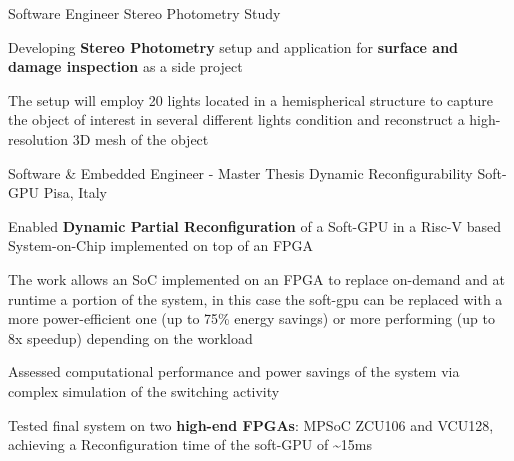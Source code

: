 

\begin{cventries}

  \cventry
    {Software Engineer} %
    {Stereo Photometry Study} %
    {} %
    {} %
    {
      \begin{cvitems} %
        \item {Developing \textbf{Stereo Photometry} setup and application for \textbf{surface and damage inspection} as a side project}
        \item {The setup will employ 20 lights located in a hemispherical structure to capture the object of interest in several different lights condition
        and reconstruct a high-resolution 3D mesh of the object}
      \end{cvitems}
    }

  \cventry
    {Software \& Embedded Engineer - Master Thesis} %
    {Dynamic Reconfigurability Soft-GPU} %
    {Pisa, Italy} %
    {} %
    {
      \begin{cvitems} %
        \item {Enabled \textbf{Dynamic Partial Reconfiguration} of a Soft-GPU in a Risc-V based System-on-Chip implemented on top of an FPGA}
        \item {The work allows an SoC implemented on an FPGA to replace on-demand and at runtime a portion of the system, in this case the soft-gpu can be replaced with a more power-efficient one (up to 75\% energy savings) or more performing (up to 8x speedup) depending on the workload}
        \item {Assessed computational performance and power savings of the system via complex simulation of the switching activity}
        \item {Tested final system on two \textbf{high-end FPGAs}: MPSoC ZCU106 and VCU128, achieving a Reconfiguration time of the soft-GPU of \textasciitilde 15ms}
      \end{cvitems}
    }


\end{cventries}
